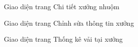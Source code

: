 \begin{figure}[H]
    \begin{center}
        \caption{Giao diện trang Chi tiết xưởng nhuộm}
        \label{result_chi_tiet_xuong}
    \end{center}
\end{figure}

\begin{figure}[H]
    \begin{center}
        \caption{Giao diện trang Chỉnh sửa thông tin xưởng}
        \label{result_sua_thong_tin_xuong}
    \end{center}
\end{figure}

\begin{figure}[H]
    \begin{center}
        \caption{Giao diện trang Thống kê vải tại xưởng}
        \label{result_ton_kho_xuong}
    \end{center}
\end{figure}

